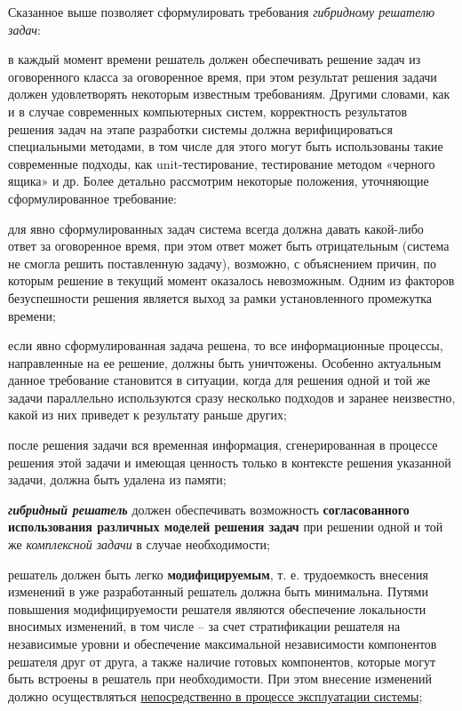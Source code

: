 Сказанное выше позволяет сформулировать требования \textit{гибридному решателю задач}:
\begin{textitemize}
	\item в каждый момент времени решатель должен обеспечивать решение задач из оговоренного класса за оговоренное время, при этом результат решения задачи должен удовлетворять некоторым известным требованиям. Другими словами, как и в случае современных компьютерных систем, корректность результатов решения задач на этапе разработки системы должна верифицироваться специальными методами, в том числе для этого могут быть использованы такие современные подходы, как unit-тестирование, тестирование методом «черного ящика» и др. Более детально рассмотрим некоторые положения, уточняющие сформулированное требование:
	\begin{textitemize}
		\item для явно сформулированных задач система всегда должна давать какой-либо ответ за оговоренное время, при этом ответ может быть отрицательным (система не смогла решить поставленную задачу), возможно, с объяснением причин, по которым решение в текущий момент оказалось невозможным. Одним из факторов безуспешности решения является выход за рамки установленного промежутка времени;
		\item если явно сформулированная задача решена, то все информационные процессы, направленные на ее решение, должны быть уничтожены. Особенно актуальным данное требование становится в ситуации, когда для решения одной и той же задачи параллельно используются сразу несколько подходов и заранее неизвестно, какой из них приведет к результату раньше других;
		\item после решения задачи вся временная информация, сгенерированная в процессе решения этой задачи и имеющая ценность только в контексте решения указанной задачи, должна быть удалена из памяти;
	\end{textitemize}
	
	\item \textit{\textbf{гибридный решатель}} должен обеспечивать возможность \textbf{согласованного использования различных моделей решения задач} при решении одной и той же \textit{комплексной задачи} в случае необходимости;
	
	\item решатель должен быть легко \textbf{модифицируемым}, т. е. трудоемкость внесения изменений в уже разработанный решатель должна быть минимальна. Путями повышения модифицируемости решателя являются обеспечение локальности вносимых изменений, в том числе -- за счет стратификации решателя на независимые уровни и обеспечение максимальной независимости компонентов решателя друг от друга, а также наличие готовых компонентов, которые могут быть встроены в решатель при необходимости. При этом внесение изменений должно осуществляться \underline{непосредственно в процессе эксплуатации системы};
	

\end{textitemize}
